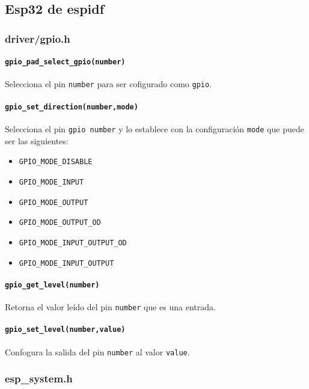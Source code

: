 \subsection*{Esp32 de espidf}

\subsubsection{driver/gpio.h}

\paragraph{\texttt{gpio\_pad\_select\_gpio(number)}}
Selecciona el pin \texttt{number} para ser cofigurado como \texttt{gpio}.

\paragraph{\texttt{gpio\_set\_direction(number,mode)}}
Selecciona el pin \texttt{gpio number} y lo establece con la configuración \texttt{mode} que puede ser las siguientes: \\

\begin{itemize}
    \item \texttt{GPIO\_MODE\_DISABLE}
    \item \texttt{GPIO\_MODE\_INPUT}
    \item \texttt{GPIO\_MODE\_OUTPUT}
    \item \texttt{GPIO\_MODE\_OUTPUT\_OD}
    \item \texttt{GPIO\_MODE\_INPUT\_OUTPUT\_OD}
    \item \texttt{GPIO\_MODE\_INPUT\_OUTPUT}
\end{itemize}

\paragraph{\texttt{gpio\_get\_level(number)}}
Retorna el valor leído del pin \texttt{number} que es una entrada.

\paragraph{\texttt{gpio\_set\_level(number,value)}}
Confogura la salida del pin \texttt{number} al valor \texttt{value}.

\subsubsection{esp\_system.h}

